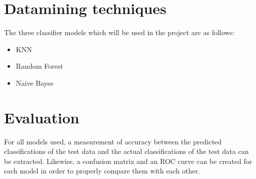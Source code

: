 \documentclass[a4paper, titlepage,12pt]{article}
\begin{document}
	\section{Datamining techniques}
		The three classifier models which will be used in the project are as follows:
		\begin{itemize}
			\item KNN
			\item Random Forest
			\item Naive Bayes
		\end{itemize}
	\section{Evaluation}
		For all models used, a measurement of accuracy  between the predicted classifications of the test data and the actual classifications of the test data can be extracted. Likewise, a confusion matrix and an ROC curve can be created for each model in order to properly compare them with each other.
	\printbibliography
\end{document}
